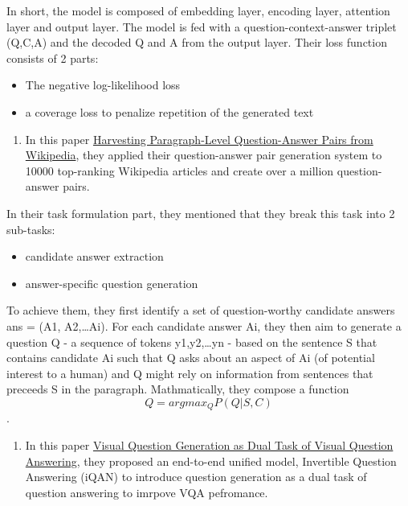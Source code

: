 \documentclass[]{book}
\providecommand{\tightlist}{%
  \setlength{\itemsep}{0pt}\setlength{\parskip}{0pt}}
\theoremstyle{definition}
\theoremstyle{definition}
\theoremstyle{definition}
\theoremstyle{remark}
\begin{document}
In short, the model is composed of embedding layer, encoding layer,
attention layer and output layer. The model is fed with a
question-context-answer triplet (Q,C,A) and the decoded Q and A from the
output layer. Their loss function consists of 2 parts:

\begin{itemize}
\item
  The negative log-likelihood loss
\item
  a coverage loss to penalize repetition of the generated text
\end{itemize}

\begin{enumerate}
\def\labelenumi{\arabic{enumi}.}
\setcounter{enumi}{1}
\tightlist
\item
  In this paper \href{https://arxiv.org/pdf/1805.05942.pdf}{Harvesting
  Paragraph-Level Question-Answer Pairs from Wikipedia}, they applied
  their question-answer pair generation system to 10000 top-ranking
  Wikipedia articles and create over a million question-answer pairs.
\end{enumerate}

In their task formulation part, they mentioned that they break this task
into 2 sub-tasks:

\begin{itemize}
\item
  candidate answer extraction
\item
  answer-specific question generation
\end{itemize}

To achieve them, they first identify a set of question-worthy candidate
answers ans = (A1, A2,\ldots{}Ai). For each candidate answer Ai, they
then aim to generate a question Q - a sequence of tokens
y1,y2,\ldots{}yn - based on the sentence S that contains candidate Ai
such that Q asks about an aspect of Ai (of potential interest to a
human) and Q might rely on information from sentences that preceeds S in
the paragraph. Mathmatically, they compose a function
\[Q = argmax_Q P(Q|S,C)\].

\begin{enumerate}
\def\labelenumi{\arabic{enumi}.}
\setcounter{enumi}{2}
\tightlist
\item
  In this paper
  \href{http://cvboy.com/pdf/publications/cvpr2018_iqan.pdf}{Visual
  Question Generation as Dual Task of Visual Question Answering}, they
  proposed an end-to-end unified model, Invertible Question Answering
  (iQAN) to introduce question generation as a dual task of question
  answering to imrpove VQA pefromance.
\end{enumerate}
\end{document}
